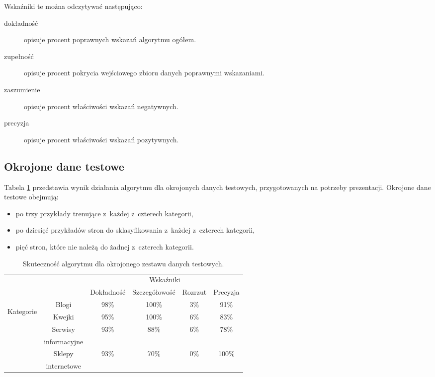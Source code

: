 \documentclass[a4paper,11pt]{article}
\begin{document}
Wskaźniki te można odczytywać następująco:

\begin{description}
    \item[dokładność] opisuje procent poprawnych wskazań algorytmu ogółem.
    \item[zupełność] opisuje procent pokrycia wejściowego zbioru danych poprawnymi wskazaniami.
    \item[zaszumienie] opisuje procent właściwości wskazań negatywnych.
    \item[precyzja] opisuje procent właściwości wskazań pozytywnych.
\end{description}

\subsection{Okrojone dane testowe}

Tabela \ref{tab:reduced_set_accuracy} przedstawia wynik działania algorytmu dla okrojonych danych testowych, przygotowanych na potrzeby prezentacji. Okrojone dane testowe obejmują:

\begin{itemize}
    \item po trzy przykłady trenujące z~każdej z~czterech kategorii,
    \item po dziesięć przykładów stron do sklasyfikowania z~każdej z~czterech kategorii,
    \item pięć stron, które nie należą do żadnej z~czterech kategorii.
\end{itemize}

\begin{table}[ht!]
\centering
    \begin{tabular}{| c | c | c | c | c | c |}
        \hline
        \multicolumn{2}{|c|}{} & \multicolumn{4}{c|}{Wskaźniki} \\
        \cline{3-6}
        \multicolumn{2}{|c|}{} & Dokładność & Szczegółowość & Rozrzut & Precyzja \\
        \hline
        \multirow{6}{*}{\begin{sideways}Kategorie \end{sideways}} & Blogi & 98\% & 100\% & 3\% & 91\% \\
        \cline{2-6}
        & Kwejki & 95\% & 100\% & 6\% & 83\% \\
        \cline{2-6}
        & Serwisy & \multirow{2}{*}{93\%} & \multirow{2}{*}{88\%} & \multirow{2}{*}{6\%} & \multirow{2}{*}{78\%} \\
        & informacyjne & & & & \\
        \cline{2-6}
        & Sklepy & \multirow{2}{*}{93\%} & \multirow{2}{*}{70\%} & \multirow{2}{*}{0\%} & \multirow{2}{*}{100\%} \\
        & internetowe & & & & \\
        \hline
    \end{tabular}
    \caption{Skuteczność algorytmu dla okrojonego zestawu danych testowych.}
    \label{tab:reduced_set_accuracy}
\end{table}
\end{document}
